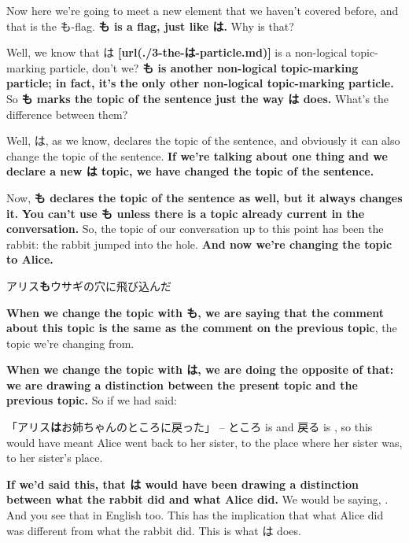 \startsectionlevel[title={The も particle},reference={the-も-particle}]

Now here we're going to meet a new element that we haven't covered before, and that is the も-flag. {\bf も is a flag, just like は.} Why is that?

{}

Well, we know that は {\bf \goto{{[}3{]}}[url(./3-the-は-particle.md)]} is a non-logical topic-marking particle, don't we? {\bf も is another non-logical topic-marking particle; in fact, it's the only other non-logical topic-marking particle.} So {\bf も marks the topic of the sentence just the way は does.} What's the difference between them?

Well, は, as we know, declares the topic of the sentence, and obviously it can also change the topic of the sentence. {\bf If we're talking about one thing and we declare a new は topic, we have changed the topic of the sentence.}

\thinrule

Now, {\bf も declares the topic of the sentence as well, but it always changes it.} {\bf You can't use も unless there is a topic already current in the conversation.} So, the topic of our conversation up to this point has been the rabbit: the rabbit jumped into the hole. {\bf And now we're changing the topic to Alice.}

\startblockquote
アリス{\bf も}ウサギの穴に飛び込んだ
\stopblockquote

{\bf When we change the topic with も, we are saying that the comment about this topic is the same as the comment on the previous topic}, the topic we're changing from.

\thinrule

{\bf When we change the topic with は, we are doing the opposite of that: we are drawing a distinction between the present topic and the previous topic.} So if we had said:

「アリス{\bf は}お姉ちゃんのところに戻った」 -- ところ is  and 戻る is , so this would have meant Alice went back to her sister, to the place where her sister was, to her sister's place.

{}

{\bf If we'd said this, that は would have been drawing a distinction between what the rabbit did and what Alice did.} We would be saying, . And you see that in English too. This has the implication that what Alice did was different from what the rabbit did.  This is what は does.

